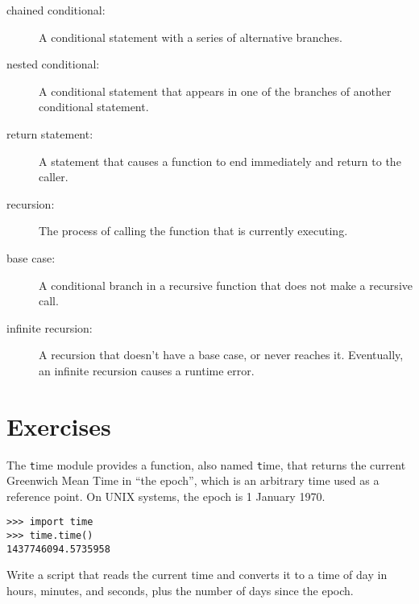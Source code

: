 \documentclass[
DIV=11,
fontsize=12,
twoside,
headinclude=false,
titlepage=firstiscover,
abstract=true,
headsepline=true,
footsepline=true,
chapterprefix=true, %
headings=big,
bibliography=totoc,%
captions=tableheading
]{scrbook}
\theoremstyle{definition}
\begin{document}
\begin{description}
\item[chained conditional:]  A conditional statement with a series
of alternative branches.

\item[nested conditional:]  A conditional statement that appears
in one of the branches of another conditional statement.

\item[return statement:] A statement that causes a function to
end immediately and return to the caller.

\item[recursion:]  The process of calling the function that is
currently executing.

\item[base case:]  A conditional branch in a
recursive function that does not make a recursive call.

\item[infinite recursion:]  A recursion that doesn't have a
base case, or never reaches it.  Eventually, an infinite recursion
causes a runtime error.

\end{description}

\section{Exercises}

\begin{exercise}
\normalfont

The {\texttt time} module provides a function, also named {\texttt time}, that
returns the current Greenwich Mean Time in ``the epoch'', which is
an arbitrary time used as a reference point.  On UNIX systems, the
epoch is 1 January 1970.

\begin{lstlisting}
>>> import time
>>> time.time()
1437746094.5735958
\end{lstlisting}

Write a script that reads the current time and converts it to
a time of day in hours, minutes, and seconds, plus the number of
days since the epoch.

\end{exercise}
\end{document}
